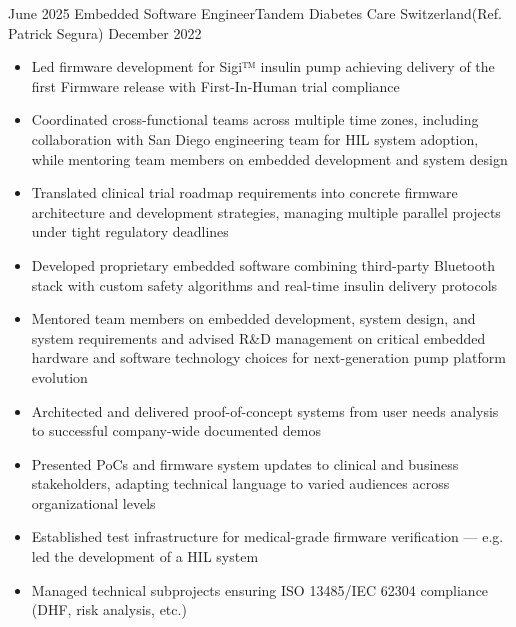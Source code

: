 %
%
%
\begin{experiences}
  \experience
    {June 2025}   {Embedded Software Engineer}{Tandem Diabetes Care Switzerland}{(Ref. Patrick Segura)}
    {December 2022} {
                      \begin{itemize}
                       \item Led firmware development for Sigi™ insulin pump achieving delivery of the first Firmware release with First-In-Human trial compliance
                       \item Coordinated cross-functional teams across multiple time zones, including collaboration with San Diego engineering team for HIL system adoption, while mentoring team members on embedded development and system design
                       \item Translated clinical trial roadmap requirements into concrete firmware architecture and development strategies, managing multiple parallel projects under tight regulatory deadlines
                       \item Developed proprietary embedded software combining third-party Bluetooth stack with custom safety algorithms and real-time insulin delivery protocols
                       \item Mentored team members on embedded development, system design,  and system requirements and advised R\&D management on critical embedded hardware and software technology choices for next-generation pump platform evolution
                        \item Architected and delivered proof-of-concept systems from user needs analysis to successful company-wide documented demos
                        \item Presented PoCs and firmware system updates to clinical and business stakeholders, adapting technical language to varied audiences across organizational levels
                        \item Established test infrastructure for medical-grade firmware verification — e.g. led the development of a HIL system
                        \item Managed technical subprojects ensuring ISO 13485/IEC 62304 compliance (DHF, risk analysis, etc.) 

\end{itemize}}
\end{experiences}
